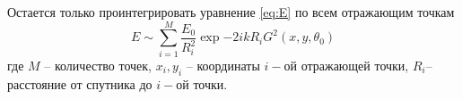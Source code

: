 Остается только проинтегрировать уравнение \eqref{eq:E} по всем отражающим
точкам 
\begin{equation}
    \label{eq:}
    E \sim \sum\limits_{i=1}^{M} \frac{E_0}{R_i^2} \exp{-2ikR_i}
    G^2(x,y,\theta_0)
\end{equation}
где $M$ -- количество точек,  $x_i,y_i$ -- координаты  $i-$ой отражающей точки,
 $R_i$-- расстояние от спутника до  $i-$ой точки.
